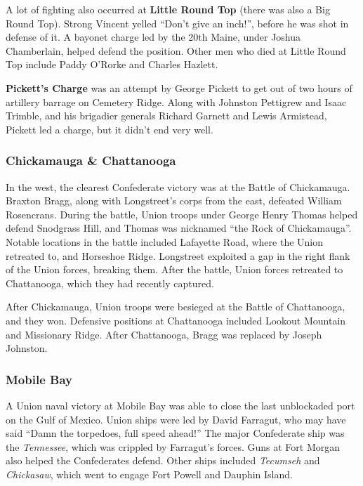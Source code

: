 A lot of fighting also occurred at \textbf{Little Round Top} (there was also a Big Round Top).
Strong Vincent yelled ``Don't give an inch!'', before he was shot in defense of it.
A bayonet charge led by the 20th Maine, under Joshua Chamberlain, helped defend the position.
Other men who died at Little Round Top include Paddy O'Rorke and Charles Hazlett.

\textbf{Pickett's Charge} was an attempt by George Pickett
to get out of two hours of artillery barrage on Cemetery Ridge.
Along with Johnston Pettigrew and Isaac Trimble, and his brigadier generals Richard Garnett and Lewis Armistead,
Pickett led a charge, but it didn't end very well.

\subsubsection*{Chickamauga \& Chattanooga}

In the west, the clearest Confederate victory was at the Battle of Chickamauga.
Braxton Bragg, along with Longstreet's corps from the east, defeated William Rosencrans.
During the battle, Union troops under George Henry Thomas helped defend Snodgrass Hill,
and Thomas was nicknamed ``the Rock of Chickamauga''.
Notable locations in the battle included Lafayette Road, where the Union retreated to, and Horseshoe Ridge.
Longstreet exploited a gap in the right flank of the Union forces, breaking them.
After the battle, Union forces retreated to Chattanooga, which they had recently captured.

After Chickamauga, Union troops were besieged at the Battle of Chattanooga, and they won.
Defensive positions at Chattanooga included Lookout Mountain and Missionary Ridge.
After Chattanooga, Bragg was replaced by Joseph Johnston.

\subsubsection*{Mobile Bay}

A Union naval victory at Mobile Bay was able to close the last unblockaded port on the Gulf of Mexico.
Union ships were led by David Farragut, who may have said ``Damn the torpedoes, full speed ahead!''
The major Confederate ship was the \textit{Tennessee}, which was crippled by Farragut's forces.
Guns at Fort Morgan also helped the Confederates defend.
Other ships included \textit{Tecumseh} and \textit{Chickasaw},
which went to engage Fort Powell and Dauphin Island.


